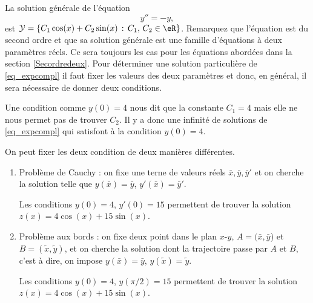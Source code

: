 \begin{example}
  La solution générale de l'équation 
    \begin{equation}\label{eq_expcompl}
      y'' = -y,
    \end{equation}
    est \(\mathcal{Y}= \{C_1\cos(x) + C_2\sin(x) \, :\, C_1,\, C_2\in\eR\}\). Remarquez que l'équation est du second ordre et que sa solution générale est une famille d'équations \`a deux paramètres réels. Ce sera toujours les cas pour les équations abordées dans la section \ref{Secordredeux}. 
    Pour déterminer une solution particulière de \eqref{eq_expcompl} il faut fixer les valeurs des deux paramètres et donc, en général, il sera nécessaire de donner deux conditions. 
\end{example}

    \begin{remark}
      Une condition comme \(y(0)=4\) nous dit que la constante $C_1 = 4$ mais elle ne nous permet pas de trouver $C_2$. Il y a donc une infinité de solutions de \eqref{eq_expcompl} qui satisfont \`a la condition \(y(0)=4\).
    \end{remark}

On peut fixer les deux condition de deux manières différentes.
\begin{enumerate}
\item{Problème  de Cauchy :} on fixe une terne de valeurs réels \(\bar x, \bar y, \bar y'\) et on cherche la solution telle que \(y(\bar x) = \bar y\), \(y'(\bar x) = \bar y'\).

  \begin{example}
    Les conditions \(y(0)=4\), \(y'(0)=15\) permettent de trouver la solution \(z(x) = 4\cos(x) + 15\sin(x)\).  
  \end{example}
\item{Problème aux bords :} on fixe deux point dans le plan $x$-$y$, \(A=(\bar x, \bar y\)) et \(B=(\tilde x, \tilde y)\), et on cherche la solution dont la trajectoire passe par $A$ et $B$, c'est \`a dire, on impose \(y(\bar x) = \bar y\), \(y(\tilde x) = \tilde y\). 

\begin{example}
    Les conditions \(y(0)=4\), \(y(\pi/2)=15\) permettent de trouver la solution \(z(x) = 4\cos(x) + 15\sin(x)\).  
  \end{example}
\end{enumerate}

